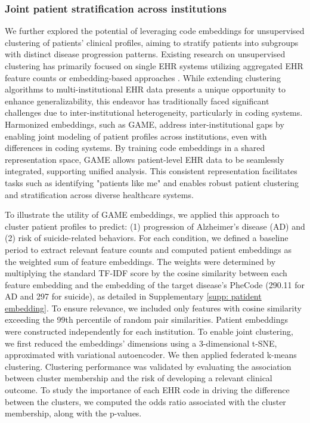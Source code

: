 \documentclass{article}
\begin{document}
\subsubsection{Joint patient stratification across institutions}
\label{method:strat}
We further explored the potential of leveraging code embeddings for unsupervised clustering of patients' clinical profiles, aiming to stratify patients into subgroups with distinct disease progression patterns. Existing research on unsupervised clustering has primarily focused on single EHR systems utilizing aggregated EHR feature counts \cite{doshi2014comorbidity, li2015identification} or embedding-based approaches \cite{landi2020deep}. While extending clustering algorithms to multi-institutional EHR data presents a unique opportunity to enhance generalizability, this endeavor has traditionally faced significant challenges due to 
inter-institutional heterogeneity, particularly in coding systems. Harmonized embeddings, such as GAME, address inter-institutional gaps by enabling joint modeling of patient profiles across institutions, even with differences in coding systems. By training code embeddings in a shared representation space, GAME allows patient-level EHR data to be seamlessly integrated, supporting unified analysis. This consistent representation facilitates tasks such as identifying "patients like me" and enables robust patient clustering and stratification across diverse healthcare systems.


To illustrate the utility of GAME embeddings, we applied this approach to cluster patient profiles to predict: (1) progression of Alzheimer’s disease (AD) and (2) risk of suicide-related behaviors. For each condition, we defined a baseline period to extract relevant feature counts and computed patient embeddings as the weighted sum of feature embeddings. The weights were determined by multiplying the standard TF-IDF score by the cosine similarity between each feature embedding and the embedding of the target disease's PheCode (290.11 for AD and 297 for suicide), as detailed in Supplementary \ref{supp: patident embedding}. 
To ensure relevance, we included only features with cosine similarity exceeding the 99th percentile of random pair similarities. Patient embeddings were constructed independently for each institution. To enable joint clustering, we first reduced the embeddings' dimensions using a 3-dimensional t-SNE, approximated with variational autoencoder. We then applied federated k-means clustering. Clustering performance was validated by evaluating the association between cluster membership and the risk of developing a relevant clinical outcome. To study the importance of each EHR code in driving the difference between the clusters, we computed the odds ratio associated with the cluster membership, along with the p-values.
\end{document}
